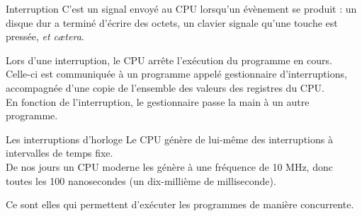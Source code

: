 \documentclass[10pt]{beamer}
\begin{document}
\begin{frame}{Interruption}\pause
C'est un signal envoyé au CPU lorsqu'un évènement se produit : un disque dur a terminé d'écrire des octets, un clavier signale qu'une touche est pressée, \textit{et c\ae tera}.\\\pause

Lors d'une interruption, le CPU arrête l'exécution du programme en cours.\\
Celle-ci est communiquée à un programme appelé \alert{gestionnaire d'interruptions}, accompagnée d'une copie de l'ensemble des valeurs des registres du CPU.\\\pause
En fonction de l'interruption, le gestionnaire passe la main à un autre programme.
\end{frame}
\begin{frame}{Les interruptions d'horloge}\pause
Le CPU génère de lui-même des interruptions à intervalles de temps fixe.\\\pause
De nos jours un CPU moderne les génère à une fréquence de 10 MHz, donc toutes les 100 nanosecondes (un dix-millième de milliseconde).\\\pause

Ce sont elles qui permettent d'exécuter les programmes de manière concurrente.
\end{frame}
\end{document}

